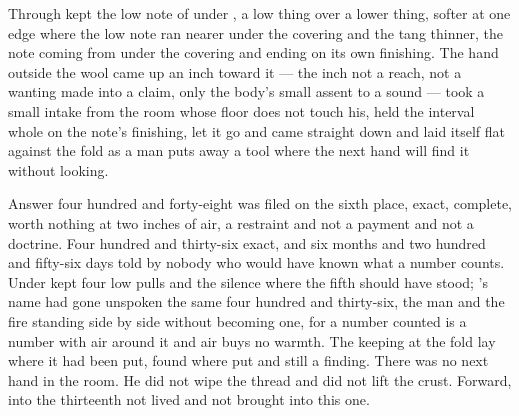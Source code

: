 Through   kept the low note of  under , a low thing over a lower thing, softer at one edge where the low note ran nearer under the covering and the tang thinner, the note coming from under the covering and ending on its own finishing. The hand outside the wool came up an inch toward it --- the inch not a reach, not a wanting made into a claim, only the body's small assent to a sound --- took a small intake from the room whose floor does not touch his, held the interval whole on the note's finishing, let it go and came straight down and laid itself flat against the fold as a man puts away a tool where the next hand will find it without looking.

Answer four hundred and forty-eight was filed on the sixth place, exact, complete, worth nothing at two inches of air, a restraint and not a payment and not a doctrine. Four hundred and thirty-six exact, and six months and two hundred and fifty-six days told by nobody who would have known what a number counts. Under   kept four low pulls and the silence where the fifth should have stood; 's name had gone unspoken the same four hundred and thirty-six, the man and the fire standing side by side without becoming one, for a number counted is a number with air around it and air buys no warmth. The keeping at the fold lay where it had been put, found where put and still a finding. There was no next hand in the room. He did not wipe the thread and did not lift the crust. Forward, into the thirteenth not lived and not brought into this one.
